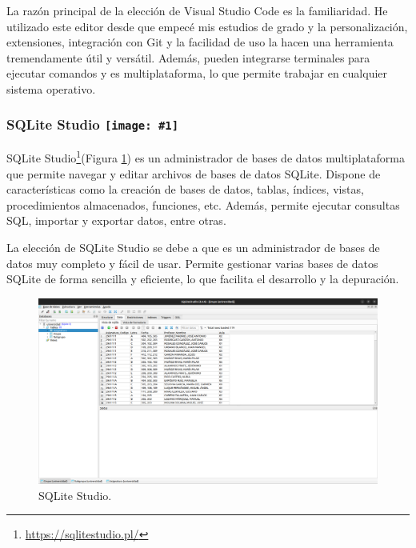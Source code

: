 La razón principal de la elección de Visual Studio Code es la familiaridad. He utilizado este editor desde que empecé mis estudios de grado y la personalización, extensiones, integración con Git y la facilidad de uso la hacen una herramienta tremendamente útil y versátil. Además, pueden integrarse terminales para ejecutar comandos y es multiplataforma, lo que permite trabajar en cualquier sistema operativo.\newline

\renewcommand{\icon}[1]{\texttt{[image: \#1]}}
\subsubsection*{SQLite Studio \protect\icon{./imagenes/sqlite_logo.png}}

SQLite Studio\footnote{\url{https://sqlitestudio.pl/}}(Figura \ref{fig:sqlitestudio}) es un administrador de bases de datos multiplataforma que permite navegar y editar archivos de bases de datos SQLite. Dispone de características como la creación de bases de datos, tablas, índices, vistas, procedimientos almacenados, funciones, etc. Además, permite ejecutar consultas SQL, importar y exportar datos, entre otras.\newline


La elección de SQLite Studio se debe a que es un administrador de bases de datos muy completo y fácil de usar. Permite gestionar varias bases de datos SQLite de forma sencilla y eficiente, lo que facilita el desarrollo y la depuración.\newline

\begin{figure}[H]
    \centering
    \includegraphics[width=1\textwidth]{./imagenes/SQLiteStudio.png}
    \caption{SQLite Studio.}
    \label{fig:sqlitestudio}
\end{figure}


